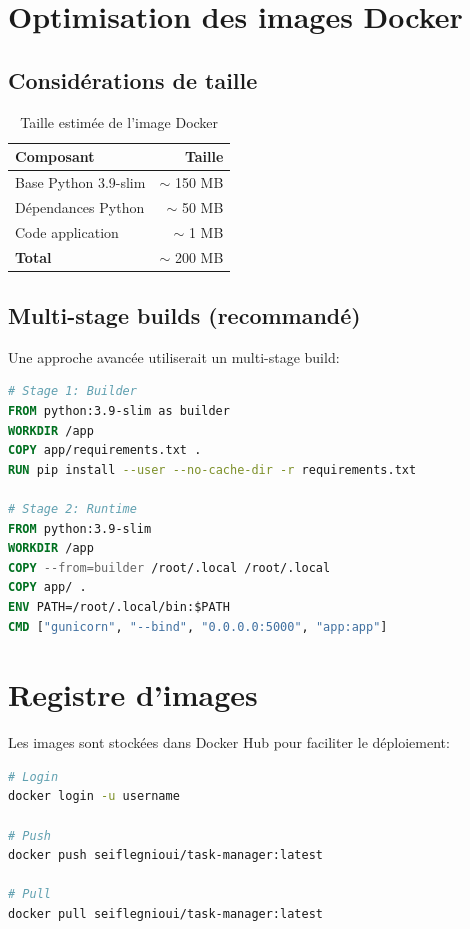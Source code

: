 \documentclass[12pt,a4paper,twoside]{report}
\begin{document}
\section{Optimisation des images Docker}

\subsection{Considérations de taille}

\begin{table}[H]
    \centering
    \caption{Taille estimée de l'image Docker}
    \begin{tabular}{|l|r|}
        \hline
        \textbf{Composant} & \textbf{Taille} \\
        \hline
        Base Python 3.9-slim & $\sim$ 150 MB \\
        Dépendances Python & $\sim$ 50 MB \\
        Code application & $\sim$ 1 MB \\
        \hline
        \textbf{Total} & $\sim$ 200 MB \\
        \hline
    \end{tabular}
\end{table}

\subsection{Multi-stage builds (recommandé)}

Une approche avancée utiliserait un multi-stage build:

\begin{lstlisting}[language=dockerfile]
# Stage 1: Builder
FROM python:3.9-slim as builder
WORKDIR /app
COPY app/requirements.txt .
RUN pip install --user --no-cache-dir -r requirements.txt

# Stage 2: Runtime
FROM python:3.9-slim
WORKDIR /app
COPY --from=builder /root/.local /root/.local
COPY app/ .
ENV PATH=/root/.local/bin:$PATH
CMD ["gunicorn", "--bind", "0.0.0.0:5000", "app:app"]
\end{lstlisting}

\section{Registre d'images}

Les images sont stockées dans Docker Hub pour faciliter le déploiement:

\begin{lstlisting}[language=bash]
# Login
docker login -u username

# Push
docker push seiflegnioui/task-manager:latest

# Pull
docker pull seiflegnioui/task-manager:latest
\end{lstlisting}
\end{document}
